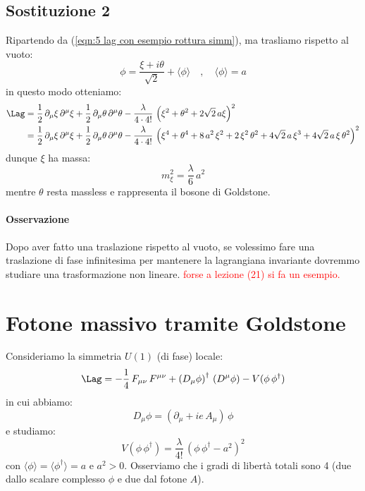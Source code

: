 \subsection{Sostituzione 2}

Ripartendo da (\ref{eqn:5 lag con esempio rottura simm}), ma trasliamo rispetto al vuoto:
\begin{equation}
    \phi = \frac{\xi + i\theta}{\sqrt{2}} + \langle\phi\rangle \quad , \quad \langle\phi\rangle = a
\end{equation}
in questo modo otteniamo:
\begin{align}
    \Lag &= \frac{1}{2}\, \partial_\mu\xi\, \partial^\mu\xi + \frac{1}{2}\, \partial_\mu\theta\, \partial^\mu\theta - \frac{\lambda}{4\cdot 4!}\, \left( \xi^2 + \theta^2 + 2\sqrt{2}\, a\xi \right)^2 \\
    &= \frac{1}{2}\, \partial_\mu\xi\, \partial^\mu\xi + \frac{1}{2}\, \partial_\mu\theta\, \partial^\mu\theta - \frac{\lambda}{4\cdot 4!}\, \left( \xi^4 + \theta^4 + 8\, a^2\, \xi^2 + 2\, \xi^2\, \theta^2 + 4\sqrt{2}\, a\, \xi^3 + 4\sqrt{2}\, a\, \xi\, \theta^2 \right)^2
\end{align}
dunque $\xi$ ha massa:
\begin{equation}
    m_\xi^2 = \frac{\lambda}{6}\, a^2
\end{equation}
mentre $\theta$ resta massless e rappresenta il bosone di Goldstone.

\paragraph{Osservazione}Dopo aver fatto una traslazione rispetto al vuoto, se volessimo fare una traslazione di fase infinitesima per mantenere la lagrangiana invariante dovremmo studiare una trasformazione non lineare. \textcolor{red}{forse a lezione (21) si fa un esempio.}


\section{Fotone massivo tramite Goldstone}

Consideriamo la simmetria $U(1)$ (di fase) locale:
\begin{equation}
    \Lag = -\frac{1}{4}\, F_{\mu\nu}\, F^{\mu\nu} + \left(D_\mu\phi\right)^\dagger\, \left(D^\mu\phi\right) - V(\phi\, \phi^\dagger)
\end{equation}
in cui abbiamo:
\begin{equation}
    D_\mu\phi = \left( \partial_\mu + ie\, A_\mu \right)\, \phi
\end{equation}
e studiamo:
\begin{equation}
    V(\phi\, \phi^\dagger) = \frac{\lambda}{4!}\, \left( \phi\, \phi^\dagger - a^2 \right)^2
\end{equation}
con $\langle\phi\rangle = \langle\phi^\dagger\rangle = a$ e $a^2>0$. Osserviamo che i gradi di libertà totali sono 4 (due dallo scalare complesso $\phi$ e due dal fotone $A$).


